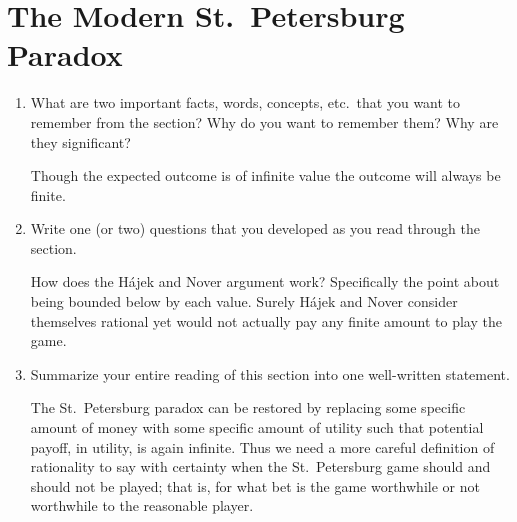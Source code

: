 \documentclass[a4paper, 12pt]{config/homework}
\begin{document}
\section{The Modern St.\ Petersburg Paradox}
\begin{enumerate}[label=\roman*.]
\item What are two important facts, words, concepts, etc.\ that you want to remember from the section? Why do you want to remember them? Why are they significant?

Though the expected outcome is of infinite value the outcome will always be finite.

\item Write one (or two) questions that you developed as you read through the section.

How does the H{\'a}jek and Nover argument work? Specifically the point about being bounded below by each value. Surely H{\'a}jek and Nover consider themselves rational yet would not actually pay any finite amount to play the game.

\item Summarize your entire reading of this section into one well-written statement.

The St.\ Petersburg paradox can be restored by replacing some specific amount of money with some specific amount of utility such that potential payoff, in utility, is again infinite. Thus we need a more careful definition of rationality to say with certainty when the St.\ Petersburg game should and should not be played; that is, for what bet is the game worthwhile or not worthwhile to the reasonable player.

\end{enumerate}
\end{document}

